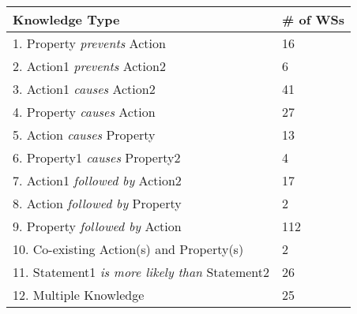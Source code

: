 

\begin{tabular}{ l | l }
    
    \textbf{Knowledge Type} & \textbf{\# of WSs} \\\hline
    1. Property \textit{prevents} Action  & 16 \\\hline
    2. Action1 \textit{prevents} Action2  & 6 \\\hline
    3. Action1 \textit{causes} Action2 & 41 \\\hline
    4. Property \textit{causes} Action & 27 \\\hline
    5. Action \textit{causes} Property & 13 \\\hline
    6. Property1 \textit{causes} Property2 & 4 \\\hline
    7. Action1 \textit{followed by} Action2  & 17\\\hline
    8. Action \textit{followed by} Property & 2 \\\hline
    9. Property \textit{followed by} Action &112 \\\hline
    10. Co-existing Action(s) and Property(s)& 2 \\\hline
    11. Statement1 \textit{is more likely than} Statement2 &26\\\hline
    12. Multiple Knowledge  &25 
\end{tabular}


